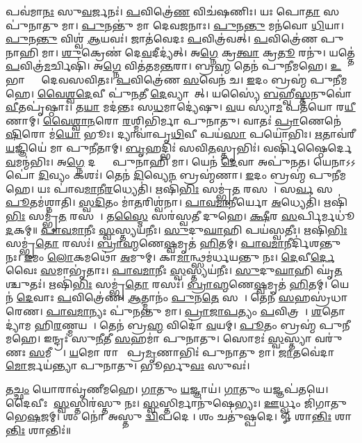 𑌪𑌵॑𑌮𑌾\ul{𑌨𑌃} 𑌸𑍁\ul{𑌵}𑌰𑍍𑌜𑌨𑌃॑। \ul{𑌪}𑌵𑌿𑌤𑍍𑌰𑍇॑\ul{𑌣} 𑌵𑌿𑌚॑\ur{}𑌷𑌣𑌿𑌃। 𑌯𑌃 𑌪𑍋\ul{𑌤𑌾} 𑌸 𑌪𑍁॑𑌨𑌾𑌤𑍁 𑌮𑌾। \ul{𑌪𑍁}𑌨𑌨𑍍𑌤𑍁॑ 𑌮𑌾 𑌦𑍇𑌵\ul{𑌜}𑌨𑌾𑌃।
\ul{𑌪𑍁}𑌨\ul{𑌨𑍍𑌤𑍁} 𑌮𑌨॑𑌵𑍋 \ul{𑌧𑌿}𑌯𑌾। \ul{𑌪𑍁}𑌨\ul{𑌨𑍍𑌤𑍁} 𑌵𑌿𑌶𑍍𑌵॑ \ul{𑌆}𑌯𑌵𑌃॑। 𑌜𑌾𑌤॑𑌵𑍇𑌦𑌃 \ul{𑌪}𑌵𑌿𑌤𑍍𑌰॑𑌵𑌤𑍍। \ul{𑌪}𑌵𑌿𑌤𑍍𑌰𑍇॑𑌣 𑌪𑍁𑌨𑌾𑌹𑌿 𑌮𑌾।
\ul{𑌶𑍁}𑌕𑍍𑌰𑍇𑌣॑ 𑌦𑍇\ul{𑌵}𑌦𑍀𑌦𑍍𑌯॑𑌤𑍍। 𑌅\ul{𑌗𑍍𑌨𑍇} 𑌕𑍍𑌰\ul{𑌤𑍍𑌵𑌾} 𑌕𑍍𑌰\ul{𑌤𑍂}\ul{} 𑌰𑌨𑍁॑। 𑌯𑌤𑍍𑌤𑍇॑ \ul{𑌪}𑌵𑌿𑌤𑍍𑌰॑\ul{𑌮}𑌰𑍍𑌚𑌿𑌷𑌿॑। 𑌅\ul{𑌗𑍍𑌨𑍇} 𑌵𑌿𑌤॑𑌤𑌮\ul{𑌨𑍍𑌤}𑌰𑌾।
𑌬𑍍𑌰\ul{𑌹𑍍𑌮} 𑌤𑍇𑌨॑ 𑌪𑍁𑌨𑍀𑌮𑌹𑍇। \ul{𑌉}𑌭𑌾𑌭𑍍𑌯𑌾𑌂᳚ 𑌦𑍇𑌵𑌸𑌵𑌿𑌤𑌃। \ul{𑌪}𑌵𑌿𑌤𑍍𑌰𑍇॑𑌣 \ul{𑌸}𑌵𑍇𑌨॑ 𑌚। \ul{𑌇}𑌦𑌂 𑌬𑍍𑌰𑌹𑍍𑌮॑ 𑌪𑍁𑌨𑍀𑌮𑌹𑍇।
\ul{𑌵𑍈}\ul{𑌶𑍍𑌵}\ul{𑌦𑍇}𑌵𑍀 𑌪𑍁॑\ul{𑌨}𑌤𑍀 \ul{𑌦𑍇}𑌵𑍍𑌯𑌾𑌗𑌾᳚𑌤𑍍। 𑌯𑌸𑍍𑌯𑍈॑ \ul{𑌬}𑌹𑍍𑌵𑍀\ul{𑌸𑍍𑌤}𑌨𑍁𑌵𑍋॑ \ul{𑌵𑍀}𑌤𑌪𑍃॑𑌷𑍍𑌠𑌾𑌃।
𑌤\ul{𑌯𑌾} 𑌮𑌦॑𑌨𑍍𑌤𑌃 𑌸\ul{𑌧}𑌮𑌾𑌦𑍍𑌯𑍇॑𑌷𑍁। \ul{𑌵}𑌯 𑌸𑍍𑌯𑌾॑\ul{𑌮} 𑌪𑌤॑𑌯𑍋 𑌰\ul{𑌯𑍀}𑌣𑌾𑌮𑍍।
\ul{𑌵𑍈}\ul{𑌶𑍍𑌵𑌾}\ul{𑌨}𑌰𑍋 \ul{𑌰}𑌶𑍍𑌮𑌿𑌭𑌿॑𑌰𑍍𑌮𑌾 𑌪𑍁𑌨𑌾𑌤𑍁। 𑌵𑌾𑌤𑌃॑ \ul{𑌪𑍍𑌰𑌾}𑌣𑍇𑌨𑍇॑\ul{𑌷𑌿}𑌰𑍋 𑌮॑\ul{𑌯𑍋} 𑌭𑍂𑌃।
𑌦𑍍𑌯𑌾𑌵𑌾॑𑌪𑍃\ul{𑌥𑌿}𑌵𑍀 𑌪𑌯॑\ul{𑌸𑌾} 𑌪𑌯𑍋॑𑌭𑌿𑌃। \ul{𑌋}𑌤𑌾𑌵॑𑌰𑍀 \ul{𑌯}𑌜𑍍𑌞𑌿𑌯𑍇॑ 𑌮𑌾 𑌪𑍁𑌨𑍀𑌤𑌾𑌮𑍍।
\ul{𑌬𑍃}𑌹𑌦𑍍𑌭𑌿𑌃॑ 𑌸𑌵𑌿\ul{𑌤}𑌸𑍍𑌤𑍃𑌭𑌿𑌃॑। 𑌵𑌰𑍍{}𑌷𑌿॑𑌷𑍍𑌠𑍈𑌰𑍍𑌦𑍇\ul{𑌵}𑌮𑌨𑍍𑌮॑𑌭𑌿𑌃।
𑌅\ul{𑌗𑍍𑌨𑍇} 𑌦𑌕𑍍𑌷𑍈𑌃᳚ 𑌪𑍁𑌨𑌾𑌹𑌿 𑌮𑌾। 𑌯𑍇𑌨॑ \ul{𑌦𑍇}𑌵𑌾 𑌅𑌪𑍁॑𑌨𑌤।
𑌯𑍇𑌨𑌾𑌽𑌽𑌪𑍋॑ \ul{𑌦𑌿}𑌵𑍍𑌯𑌂 𑌕𑌶𑌃॑। 𑌤𑍇𑌨॑ \ul{𑌦𑌿}𑌵𑍍𑌯𑍇\ul{𑌨} 𑌬𑍍𑌰𑌹𑍍𑌮॑𑌣𑌾। \ul{𑌇}𑌦𑌂 𑌬𑍍𑌰𑌹𑍍𑌮॑ 𑌪𑍁𑌨𑍀𑌮𑌹𑍇। 𑌯𑌃 𑌪𑌾॑𑌵\ul{𑌮𑌾}𑌨𑍀\ul{𑌰}𑌧𑍍𑌯𑍇𑌤𑌿॑।
𑌋𑌷𑌿॑\ul{𑌭𑌿𑌃} 𑌸𑌮𑍍𑌭𑍃॑\ul{𑌤}\ul{} 𑌰𑌸𑌮𑍍᳚। 𑌸\ul{𑌰𑍍𑌵}\ul{} 𑌸 \ul{𑌪𑍂}𑌤𑌮॑𑌶𑍍𑌨𑌾𑌤𑌿।
\ul{𑌸𑍍𑌵}\ul{𑌦𑌿}𑌤𑌂 𑌮𑌾॑\ul{𑌤}𑌰𑌿𑌶𑍍𑌵॑𑌨𑌾। \ul{𑌪𑌾}\ul{𑌵}\ul{𑌮𑌾}𑌨𑍀𑌰𑍍𑌯𑍋 \ul{𑌅}𑌧𑍍𑌯𑍇𑌤𑌿॑।
𑌋𑌷𑌿॑\ul{𑌭𑌿𑌃} 𑌸𑌮𑍍𑌭𑍃॑\ul{𑌤}\ul{} 𑌰𑌸𑌮𑍍᳚। 𑌤\ul{𑌸𑍍𑌮𑍈} 𑌸𑌰॑𑌸𑍍𑌵𑌤𑍀 𑌦𑍁𑌹𑍇। \ul{𑌕𑍍𑌷𑍀}𑌰 \ul{𑌸}𑌰𑍍𑌪𑌿𑌰𑍍𑌮𑌧𑍂॑\ul{𑌦}𑌕𑌮𑍍॥
\ul{𑌪𑌾}\ul{𑌵}\ul{𑌮𑌾}𑌨𑍀𑌃 \ul{𑌸𑍍𑌵}𑌸𑍍𑌤𑍍𑌯𑌯॑𑌨𑍀𑌃। \ul{𑌸𑍁}𑌦𑍁\ul{𑌘𑌾}𑌹𑌿 𑌪𑌯॑𑌸𑍍𑌵𑌤𑍀𑌃।
𑌋𑌷𑌿॑\ul{𑌭𑌿𑌃} 𑌸𑌮𑍍𑌭𑍃॑\ul{𑌤𑍋} 𑌰𑌸𑌃॑। \ul{𑌬𑍍𑌰𑌾}\ul{𑌹𑍍𑌮}𑌣𑍇\ul{𑌷𑍍𑌵}𑌮𑍃𑌤॑ \ul{𑌹𑌿}𑌤𑌮𑍍।
\ul{𑌪𑌾}\ul{𑌵}\ul{𑌮𑌾}𑌨𑍀𑌰𑍍𑌦𑌿॑𑌶𑌨𑍍𑌤𑍁 𑌨𑌃। \ul{𑌇}𑌮𑌂 \ul{𑌲𑍋}𑌕𑌮𑌥𑍋॑ \ul{𑌅}𑌮𑍁𑌮𑍍।
𑌕𑌾\ul{𑌮𑌾}𑌨𑍍𑌥𑍍𑌸𑌮॑𑌰𑍍𑌧𑌯𑌨𑍍𑌤𑍁 𑌨𑌃। \ul{𑌦𑍇}𑌵𑍀\ul{𑌰𑍍𑌦𑍇}𑌵𑍈𑌃 \ul{𑌸}𑌮𑌾𑌭𑍃॑𑌤𑌾𑌃।
\ul{𑌪𑌾}\ul{𑌵}\ul{𑌮𑌾}𑌨𑍀𑌃 \ul{𑌸𑍍𑌵}𑌸𑍍𑌤𑍍𑌯𑌯॑𑌨𑍀𑌃। \ul{𑌸𑍁}𑌦𑍁\ul{𑌘𑌾}𑌹𑌿 𑌘𑍃॑\ul{𑌤}𑌶𑍍𑌚𑍁𑌤𑌃॑।
𑌋𑌷𑌿॑\ul{𑌭𑌿𑌃} 𑌸𑌮𑍍𑌭𑍃॑\ul{𑌤𑍋} 𑌰𑌸𑌃॑। \ul{𑌬𑍍𑌰𑌾}\ul{𑌹𑍍𑌮}𑌣𑍇\ul{𑌷𑍍𑌵}𑌮𑍃𑌤॑ \ul{𑌹𑌿}𑌤𑌮𑍍।
𑌯𑍇𑌨॑ \ul{𑌦𑍇}𑌵𑌾𑌃 \ul{𑌪}𑌵𑌿𑌤𑍍𑌰𑍇॑𑌣। \ul{𑌆}𑌤𑍍𑌮𑌾𑌨𑌂॑ \ul{𑌪𑍁}𑌨\ul{𑌤𑍇} 𑌸𑌦𑌾᳚।
𑌤𑍇𑌨॑ \ul{𑌸}𑌹𑌸𑍍𑌰॑𑌧𑌾𑌰𑍇𑌣। \ul{𑌪𑌾}\ul{𑌵}\ul{𑌮𑌾}𑌨𑍍𑌯𑌃 𑌪𑍁॑𑌨𑌨𑍍𑌤𑍁 𑌮𑌾।
\ul{𑌪𑍍𑌰𑌾}\ul{𑌜𑌾}\ul{𑌪}𑌤𑍍𑌯𑌂 \ul{𑌪}𑌵𑌿𑌤𑍍𑌰𑌮𑍍᳚। \ul{𑌶}𑌤𑍋𑌦𑍍𑌯𑌾॑𑌮 𑌹𑌿\ul{𑌰}𑌣𑍍𑌮𑌯𑌮𑍍᳚।
𑌤𑍇𑌨॑ 𑌬𑍍𑌰\ul{𑌹𑍍𑌮} 𑌵𑌿𑌦𑍋॑ \ul{𑌵}𑌯𑌮𑍍। \ul{𑌪𑍂}𑌤𑌂 𑌬𑍍𑌰𑌹𑍍𑌮॑ 𑌪𑍁𑌨𑍀𑌮𑌹𑍇।
𑌇𑌨𑍍𑌦𑍍𑌰𑌃॑ 𑌸𑍁\ul{𑌨𑍀}𑌤𑍀 \ul{𑌸}𑌹𑌮𑌾॑ 𑌪𑍁𑌨𑌾𑌤𑍁। 𑌸𑍋𑌮𑌃॑ \ul{𑌸𑍍𑌵}𑌸𑍍𑌤𑍍𑌯𑌾 𑌵𑌰𑍁॑𑌣𑌃 \ul{𑌸}𑌮𑍀𑌚𑍍𑌯𑌾᳚।
\ul{𑌯}𑌮𑍋 𑌰𑌾𑌜𑌾᳚ 𑌪𑍍𑌰\ul{𑌮𑍃}𑌣𑌾𑌭𑌿𑌃॑ 𑌪𑍁𑌨𑌾𑌤𑍁 𑌮𑌾। \ul{𑌜𑌾}𑌤𑌵𑍇॑𑌦𑌾 \ul{𑌮𑍋}𑌰𑍍𑌜𑌯॑𑌨𑍍𑌤𑍍𑌯𑌾 𑌪𑍁𑌨𑌾𑌤𑍁। 𑌭𑍂𑌰𑍍𑌭𑍁\ul{𑌵𑌃} 𑌸𑍁𑌵𑌃॑।

𑌤\ul{𑌚𑍍𑌛𑌂} 𑌯𑍋𑌰𑌾𑌵𑍃॑𑌣𑍀𑌮𑌹𑍇। \ul{𑌗𑌾}𑌤𑍁𑌂 \ul{𑌯}𑌜𑍍𑌞𑌾𑌯॑।
\ul{𑌗𑌾}𑌤𑍁𑌂 𑌯𑌜𑍍𑌞𑌪॑𑌤𑌯𑍇। 𑌦𑍈𑌵𑍀𑌃 \ul{𑌸𑍍𑌵}𑌸𑍍𑌤𑌿𑌰॑𑌸𑍍𑌤𑍁 𑌨𑌃।
\ul{𑌸𑍍𑌵}𑌸𑍍𑌤𑌿𑌰𑍍𑌮𑌾𑌨𑍁॑𑌷𑍇𑌭𑍍𑌯𑌃। \ul{𑌊}𑌰𑍍𑌧𑍍𑌵𑌂 𑌜𑌿॑𑌗𑌾𑌤𑍁 𑌭𑍇\ul{𑌷}𑌜𑌮𑍍।
𑌶𑌂 𑌨𑍋॑ 𑌅𑌸𑍍𑌤𑍁 \ul{𑌦𑍍𑌵𑌿}𑌪𑌦𑍇। 𑌶𑌂 𑌚𑌤𑍁॑𑌷𑍍𑌪𑌦𑍇।
𑍐 𑌶𑌾\ul{𑌨𑍍𑌤𑌿𑌃} 𑌶𑌾\ul{𑌨𑍍𑌤𑌿𑌃} 𑌶𑌾𑌨𑍍𑌤𑌿𑌃॑॥

